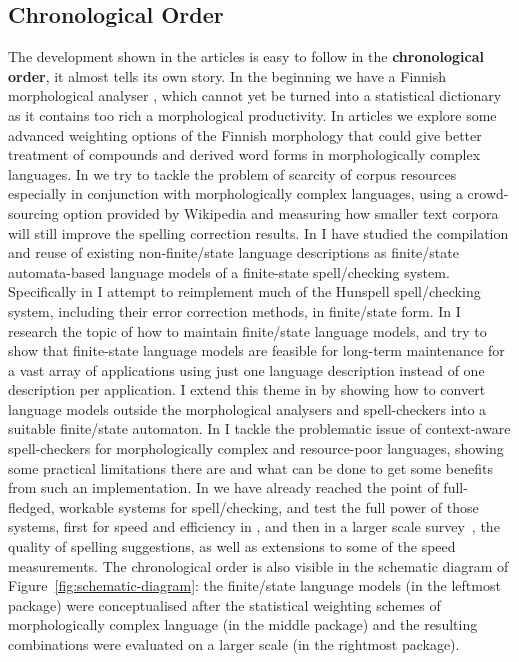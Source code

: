 \documentclass[officiallayout]{unihelcompling}
\begin{document}
\subsection{Chronological Order}
\label{subsec:chronological}

The development shown in the articles is easy to follow in the
\textbf{chronological order}, it almost tells its own story. In the beginning
we have a Finnish morphological analyser \citep{pirinen2008suomen}, which
cannot yet be turned into a statistical dictionary as it contains too rich a
morphological productivity. In articles
 we explore some advanced
weighting options of the Finnish morphology that could give better treatment of
compounds and derived word forms in morphologically complex languages. In
 we try to tackle the problem of scarcity of
corpus resources especially in conjunction with morphologically complex
languages, using a crowd-sourcing option provided by Wikipedia and measuring
how smaller text corpora will still improve the spelling correction results. In
 I have studied the
compilation and reuse of existing non-finite\-/state language descriptions as
finite\-/state automata-based language models of a finite-state
spell\-/checking system.  Specifically in  I
attempt to reimplement much of the Hunspell spell\-/checking system, including
their error correction methods, in finite\-/state form. In
 I research the topic of how to maintain
finite\-/state \glspl{language model}, and try to show that finite-state
language models are feasible for long-term maintenance for a vast array of
applications using just one language description instead of one description per
application.  I extend this theme in  by
showing how to convert language models outside the morphological analysers and
spell-checkers into a suitable finite\-/state automaton. In
 I tackle the problematic issue of
context-aware spell-checkers for morphologically complex and resource-poor
languages, showing some practical limitations there are and what can be done to
get some benefits from such an implementation. In
 we have already reached the
point of full-fledged, workable systems for spell\-/checking, and test the full
power of those systems, first for speed and efficiency in
, and then in a larger scale
survey~, the quality of spelling suggestions, as
well as extensions to some of the speed measurements.  The chronological order
is also visible in the schematic diagram of Figure~\ref{fig:schematic-diagram}:
the finite\-/state language models (in the leftmost package) were
conceptualised after the statistical weighting schemes of morphologically
complex language (in the middle package) and the resulting combinations were
evaluated on a larger scale (in the rightmost package).
\end{document}
